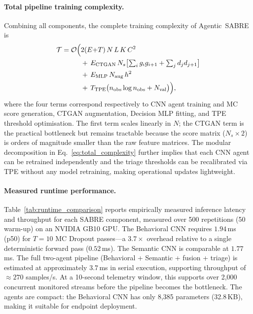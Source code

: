 \documentclass[3p]{elsarticle}
\begin{document}
\paragraph{Total pipeline training complexity.}
Combining all components, the complete training complexity of Agentic~SABRE is
\begin{align}
  \mathcal{T} = \mathcal{O}\Bigl(
    &2(E{+}T)\,N\,L\,K\,C^2 \nonumber\\
    &+\, E_{\mathrm{CTGAN}}\,N_s\bigl[\textstyle\sum_i g_i g_{i+1}
      + \sum_j d_j d_{j+1}\bigr] \nonumber\\
    &+\, E_{\mathrm{MLP}}\,N_{\mathrm{aug}}\,h^2 \nonumber\\
    &+\, T_{\mathrm{TPE}}\bigl(n_{\mathrm{obs}}\log n_{\mathrm{obs}}
      + N_{\mathrm{val}}\bigr)
  \Bigr),
  \label{eq:total_complexity}
\end{align}
where the four terms correspond respectively to CNN agent training and MC score generation,
CTGAN augmentation, Decision MLP fitting, and TPE threshold optimisation.
The first term scales linearly in $N$; the CTGAN term is the practical bottleneck but
remains tractable because the score matrix ($N_s \times 2$) is orders of magnitude smaller
than the raw feature matrices.
The modular decomposition in Eq.~\eqref{eq:total_complexity} further implies that each
CNN agent can be retrained independently and the triage thresholds can be recalibrated
via TPE without any model retraining, making operational updates lightweight.

\paragraph{Measured runtime performance.}
Table~\ref{tab:runtime_comparison} reports empirically measured inference latency and throughput for each SABRE component, measured over 500 repetitions (50 warm-up) on an NVIDIA GB10 GPU. The Behavioral CNN requires $1.94$\,ms (p50) for $T=10$ MC Dropout passes---a $3.7\times$ overhead relative to a single deterministic forward pass ($0.52$\,ms). The Semantic CNN is comparable at $1.77$\,ms. The full two-agent pipeline (Behavioral + Semantic + fusion + triage) is estimated at approximately $3.7$\,ms in serial execution, supporting throughput of $\approx 270$ samples/s. At a 10-second telemetry window, this supports over 2,000 concurrent monitored streams before the pipeline becomes the bottleneck. The agents are compact: the Behavioral CNN has only 8,385 parameters (32.8\,KB), making it suitable for endpoint deployment.
\end{document}
